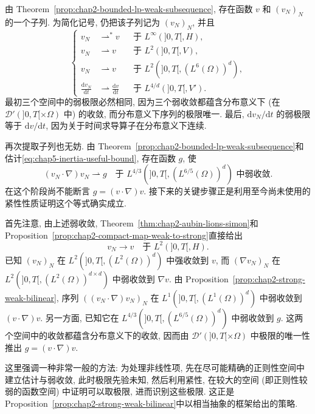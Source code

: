 由 Theorem~\ref{prop:chap2-bounded-lp-weak-subsequence}, 存在函数 $v$ 和 $(v_N)_N$ 的一个子列. 为简化记号, 仍把该子列记为 $(v_N)_N$, 并且
\[
\left\{
\begin{aligned}
 v_N&\rightharpoonup^*v&&\text{于 }L^\infty(]0,T[,H),\\
 v_N&\rightharpoonup v&&\text{于 }L^2(]0,T[,V),\\
 v_N&\rightharpoonup v&&\text{于 }L^2(]0,T[,(L^6(\Omega))^d),\\
 \frac{\mathrm dv_N}{\mathrm dt}&\rightharpoonup\frac{\mathrm dv}{\mathrm dt}
 &&\text{于 }L^{4/d}(]0,T[,V').
\end{aligned}
\right.
\]
最初三个空间中的弱极限必然相同, 因为三个弱收敛都蕴含分布意义下 (在 $\mathcal D'(]0,T[\times\Omega)$ 中) 的收敛, 而分布意义下序列的极限唯一. 最后, $\mathrm dv_N/\mathrm dt$ 的弱极限等于 $\mathrm dv/\mathrm dt$, 因为关于时间求导算子在分布意义下连续.

再次提取子列也无妨. 由 Theorem~\ref{prop:chap2-bounded-lp-weak-subsequence}和估计\eqref{eq:chap5-inertia-useful-bound}, 存在函数 $g$, 使
\[
 (v_N\cdot\nabla)v_N\rightharpoonup g
 \quad\text{于 }L^{4/3}(]0,T[,(L^{6/5}(\Omega))^d)\text{ 中弱收敛}.
\]
在这个阶段尚不能断言 $g=(v\cdot\nabla)v$. 接下来的关键步骤正是利用至今尚未使用的紧性性质证明这个等式确实成立.

首先注意, 由上述弱收敛, Theorem~\ref{thm:chap2-aubin-lions-simon}和 Proposition~\ref{prop:chap2-compact-map-weak-to-strong}直接给出
\[
 v_N\longrightarrow v\quad\text{于 }L^2(]0,T[,H).
\]
已知 $(v_N)_N$ 在 $L^2(]0,T[,(L^2(\Omega))^d)$ 中强收敛到 $v$, 而 $(\nabla v_N)_N$ 在 $L^2(]0,T[,(L^2(\Omega))^{d\times d})$ 中弱收敛到 $\nabla v$. 由 Proposition~\ref{prop:chap2-strong-weak-bilinear}, 序列 $((v_N\cdot\nabla)v_N)_N$ 在 $L^1(]0,T[,(L^1(\Omega))^d)$ 中弱收敛到 $(v\cdot\nabla)v$. 另一方面, 已知它在 $L^{4/3}(]0,T[,(L^{6/5}(\Omega))^d)$ 中弱收敛到 $g$. 这两个空间中的收敛都蕴含分布意义下的收敛, 因而由 $\mathcal D'(]0,T[\times\Omega)$ 中极限的唯一性推出 $g=(v\cdot\nabla)v$.

这里强调一种非常一般的方法: 为处理非线性项, 先在尽可能精确的正则性空间中建立估计与弱收敛, 此时极限先验未知, 然后利用紧性, 在较大的空间 (即正则性较弱的函数空间) 中证明可以取极限, 进而识别这些极限. 这正是 Proposition~\ref{prop:chap2-strong-weak-bilinear}中以相当抽象的框架给出的策略.

